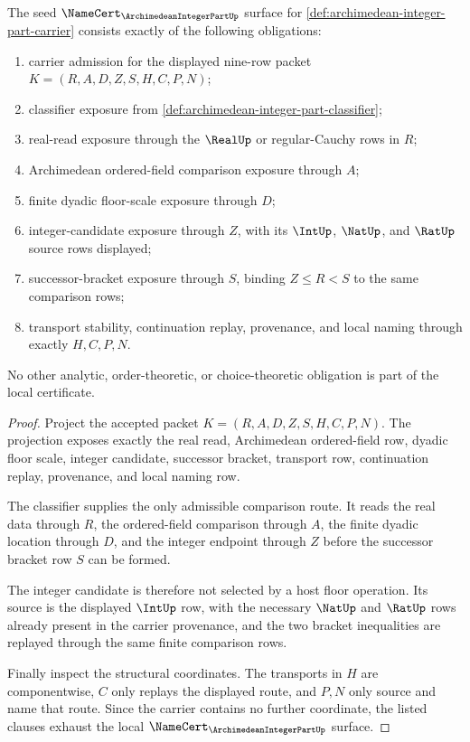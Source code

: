 \begin{theorem}
\label{thm:archimedean-integer-part-namecert-obligations}
The seed $\NameCert_{\ArchimedeanIntegerPartUp}$ surface for \autoref{def:archimedean-integer-part-carrier} consists exactly of the following obligations:
\begin{enumerate}
\item carrier admission for the displayed nine-row packet $K=(R,A,D,Z,S,H,C,P,N)$;
\item classifier exposure from \autoref{def:archimedean-integer-part-classifier};
\item real-read exposure through the $\RealUp$ or regular-Cauchy rows in $R$;
\item Archimedean ordered-field comparison exposure through $A$;
\item finite dyadic floor-scale exposure through $D$;
\item integer-candidate exposure through $Z$, with its $\IntUp$, $\NatUp$, and $\RatUp$ source rows displayed;
\item successor-bracket exposure through $S$, binding $Z\leq R<S$ to the same comparison rows;
\item transport stability, continuation replay, provenance, and local naming through exactly $H,C,P,N$.
\end{enumerate}
No other analytic, order-theoretic, or choice-theoretic obligation is part of the local certificate.
\end{theorem}
\begin{proof}
Project the accepted packet $K=(R,A,D,Z,S,H,C,P,N)$. The projection exposes exactly the real read, Archimedean ordered-field row, dyadic floor scale, integer candidate, successor bracket, transport row, continuation replay, provenance, and local naming row.

The classifier supplies the only admissible comparison route. It reads the real data through $R$, the ordered-field comparison through $A$, the finite dyadic location through $D$, and the integer endpoint through $Z$ before the successor bracket row $S$ can be formed.

The integer candidate is therefore not selected by a host floor operation. Its source is the displayed $\IntUp$ row, with the necessary $\NatUp$ and $\RatUp$ rows already present in the carrier provenance, and the two bracket inequalities are replayed through the same finite comparison rows.

Finally inspect the structural coordinates. The transports in $H$ are componentwise, $C$ only replays the displayed route, and $P,N$ only source and name that route. Since the carrier contains no further coordinate, the listed clauses exhaust the local $\NameCert_{\ArchimedeanIntegerPartUp}$ surface.
\end{proof}

